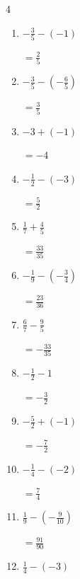 \begin{multicols}{4}
\begin{enumerate}
        $\displaystyle =-\frac{19}{6}$

  \item $\displaystyle -\frac{3}{5} - \left(-1\right)$

        $\displaystyle =\frac{2}{5}$

  \item $\displaystyle -\frac{3}{5} - \left(-\frac{6}{5}\right)$

        $\displaystyle =\frac{3}{5}$

  \item $\displaystyle -3 + \left(-1\right)$

        $\displaystyle =-4$

  \item $\displaystyle -\frac{1}{2} - \left(-3\right)$

        $\displaystyle =\frac{5}{2}$

  \item $\displaystyle \frac{1}{7} + \frac{4}{5}$

        $\displaystyle =\frac{33}{35}$

  \item $\displaystyle -\frac{1}{9} - \left(-\frac{3}{4}\right)$

        $\displaystyle =\frac{23}{36}$

  \item $\displaystyle \frac{6}{7} - \frac{9}{5}$

        $\displaystyle =-\frac{33}{35}$

\columnbreak %

\resetques

  \item $\displaystyle -\frac{1}{2} - 1$

        $\displaystyle =-\frac{3}{2}$

  \item $\displaystyle -\frac{5}{2} + \left(-1\right)$

        $\displaystyle =-\frac{7}{2}$

  \item $\displaystyle -\frac{1}{4} - \left(-2\right)$

        $\displaystyle =\frac{7}{4}$

  \item $\displaystyle \frac{1}{9} - \left(-\frac{9}{10}\right)$

        $\displaystyle =\frac{91}{90}$

  \item $\displaystyle \frac{1}{4} - \left(-3\right)$


\end{enumerate}
\end{multicols}
